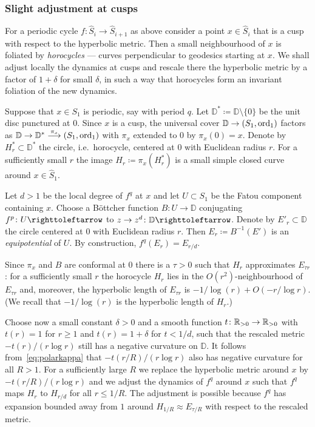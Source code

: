 \documentclass{amsart}
\begin{document}
\subsubsection{Slight adjustment at cusps}\label{sss:AdjAtCusps}
For a periodic cycle $f\colon\widehat S_i\to \widehat S_{i+1}$ as
above consider a point $x\in \widehat S_i$ that is a cusp with respect
to the hyperbolic metric. Then a small neighbourhood of $x$ is
foliated by \emph{horocycles} --- curves perpendicular to geodesics
starting at $x$. We shall adjust locally the dynamics at cusps and
rescale there the hyperbolic metric by a factor of $1+\delta$ for
small $\delta$, in such a way that horocycles form an invariant
foliation of the new dynamics.

Suppose that $x\in S_1$ is periodic, say with period $q$.  Let
$\mathbb D^*\coloneqq \mathbb D\setminus \{0\}$ be the unit disc
punctured at $0$. Since $x$ is a cusp, the universal cover
$\mathbb D\to (S_1,\operatorname{ord}_1)$ factors as
$\mathbb D\to \mathbb D^*\overset{\pi_x}{\longrightarrow}
(S_1,\operatorname{ord}_1)$ with $\pi_x$ extended to $0$ by $\pi_x(0)=x$. Denote by
$H^*_r \subset \mathbb D^*$ the circle, i.e.~horocycle, centered at
$0$ with Euclidean radius $r$. For a sufficiently small $r$ the image
$H_r\coloneqq \pi_x(H^*_r)$ is a small simple closed curve around
$x\in \widehat S_1$.

Let $d>1$ be the local degree of $f^q$ at $x$ and let $U\subset S_1$
be the Fatou component containing $x$. Choose a B\"ottcher function
$B\colon U\to \mathbb D$ conjugating $f^p\colon U\selfmap$ to
$z\to z^d\colon \mathbb D\selfmap$. Denote by $E'_r \subset \mathbb D$
the circle centered at $0$ with Euclidean radius $r$. Then
$E_r\coloneqq B^{-1}(E')$ is an \emph{equipotential} of $U$. By
construction, $f^q(E_r)=E_{r/d}$.

Since $\pi_x$ and $B$ are conformal at $0$ there is a $\tau>0$ such
that $H_r$ approximates $E_{\tau r}$: for a sufficiently small $r$ the
horocycle $H_r$ lies in the $O(r^2)$-neighbourhood of $E_{\tau r}$ and,
moreover, the hyperbolic length of $E_{\tau r}$ is $-1/\log(r)+O(-r/\log r)$. (We
recall that $-1/\log(r)$ is the hyperbolic length of $H_r$.)

Choose now a small constant $\delta>0$ and a smooth function
$t\colon {\mathbb R}_{>0} \to {\mathbb R}_{>0}$ with $t(r)=1$ for $r\ge1$ and
$t(r)=1+\delta$ for $t<1/d$, such that the rescaled metric
$-t(r)/(r\log r) $ still has a negative curvature on $\mathbb D$. It
follows from~\eqref{eq:polarkappa} that $-t(r/R)/(r\log r)$ also has
negative curvature for all $R>1$. For a sufficiently large $R$ we
replace the hyperbolic metric around $x$ by $-t(r/R)/(r\log r)$ and we
adjust the dynamics of $f^q$ around $x$ such that $f^q$ maps $H_{r}$
to $H_{r/d}$ for all $r\le 1/R$. The adjustment is possible because
$f^q$ has expansion bounded away from $1$ around
$H_{1/R}\approx E_{\tau/R}$ with respect to the rescaled metric.
\end{document}
